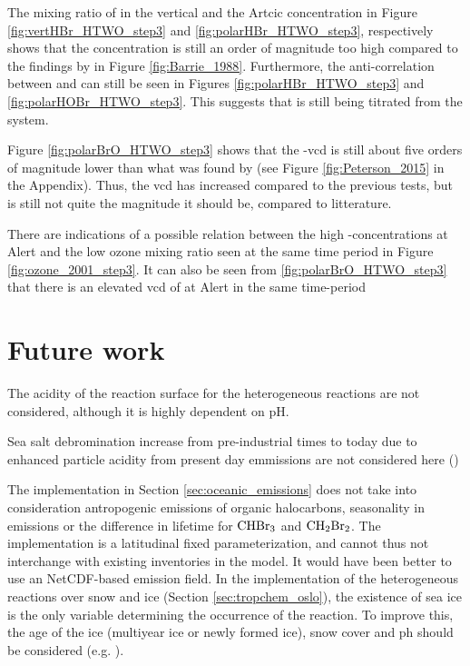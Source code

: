 \medskip

The mixing ratio of  in the vertical and the Artcic concentration in Figure \ref{fig:vertHBr_HTWO_step3} and \ref{fig:polarHBr_HTWO_step3}, respectively shows that the  concentration is still an order of magnitude too high compared to the findings by \cite{barrie} in Figure \ref{fig:Barrie_1988}. Furthermore, the anti-correlation between  and  can still be seen in Figures \ref{fig:polarHBr_HTWO_step3} and \ref{fig:polarHOBr_HTWO_step3}. This suggests that  is still being titrated from the system. 

\medskip

Figure \ref{fig:polarBrO_HTWO_step3} shows that the -\acrshort{vcd} is still about five orders of magnitude lower than what was found by \cite{Peterson2015} (see Figure \ref{fig:Peterson_2015} in the Appendix). Thus, the \acrshort{vcd} has increased compared to the previous tests, but is still not quite the magnitude it should be, compared to litterature. 

\medskip

There are indications of a possible relation between the high -concentrations at Alert and the low ozone mixing ratio seen at the same time period in Figure \ref{fig:ozone_2001_step3}. It can also be seen from \ref{fig:polarBrO_HTWO_step3} that there is an elevated \acrshort{vcd} of  at Alert in the same  time-period


\section{Future work}

The acidity of the reaction surface for the heterogeneous reactions are not considered, although it is highly dependent on pH. 

\medskip
Sea salt debromination increase from pre-industrial times to today due to enhanced particle acidity from present day emmissions are not considered here (\cite{Parella})

\medskip
The implementation in Section \ref{sec:oceanic_emissions} does not take into consideration antropogenic emissions of organic halocarbons, seasonality in emissions or the difference in lifetime for $\mathrm{CHBr_3}$ and $\mathrm{CH_2Br_2}$. The implementation is a latitudinal fixed parameterization, and cannot thus not interchange with existing inventories in the model. It would have been better to use an NetCDF-based emission field. 
\medskip
In the implementation of the heterogeneous reactions over snow and ice (Section \ref{sec:tropchem_oslo}), the existence of sea ice is the only variable determining the occurrence of the reaction. To improve this, the age of the ice (multiyear ice or newly formed ice), snow cover and ph should be considered (e.g. \cite{Peterson2019}).

